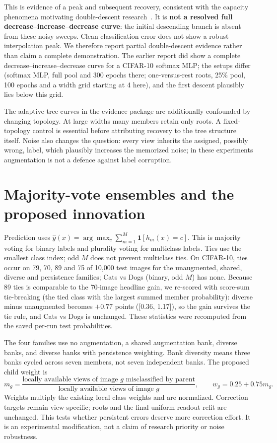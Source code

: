 \documentclass[11pt,a4paper]{article}
\begin{document}
This is evidence of a peak and subsequent recovery, consistent with the capacity phenomena motivating double-descent research~\cite{nakkiran}. It is \textbf{not a resolved full decrease--increase--decrease curve}: the initial descending branch is absent from these noisy sweeps. Clean classification error does not show a robust interpolation peak. We therefore report partial double-descent evidence rather than claim a complete demonstration. The earlier report did show a complete decrease--increase--decrease curve for a CIFAR-10 softmax MLP; the setups differ (softmax MLP, full pool and 300 epochs there; one-versus-rest roots, 25\% pool, 100 epochs and a width grid starting at 4 here), and the first descent plausibly lies below this grid.

The adaptive-tree curves in the evidence package are additionally confounded by changing topology. At large widths many members retain only roots. A fixed-topology control is essential before attributing recovery to the tree structure itself. Noise also changes the question: every view inherits the assigned, possibly wrong, label, which plausibly increases the memorized noise; in these experiments augmentation is not a defence against label corruption.

\section{Majority-vote ensembles and the proposed innovation}
Prediction uses $\hat y(x)=\arg\max_c\sum_{m=1}^{M}\mathbf1[h_m(x)=c]$. This is majority voting for binary labels and plurality voting for multiclass labels. Ties use the smallest class index; odd $M$ does not prevent multiclass ties. On CIFAR-10, ties occur on 79, 70, 89 and 75 of 10,000 test images for the unaugmented, shared, diverse and persistence families; Cats vs Dogs (binary, odd $M$) has none. Because 89 ties is comparable to the 70-image headline gain, we re-scored with score-sum tie-breaking (the tied class with the largest summed member probability): diverse minus unaugmented becomes $+0.77$ points ([0.36, 1.17]), so the gain survives the tie rule, and Cats vs Dogs is unchanged. These statistics were recomputed from the saved per-run test probabilities.

The four families use no augmentation, a shared augmentation bank, diverse banks, and diverse banks with persistence weighting. Bank diversity means three banks cycled across seven members, not seven independent banks. The proposed child weight is
\[
 m_g=\frac{\text{locally available views of image }g\text{ misclassified by parent}}
 {\text{locally available views of image }g},\qquad w_g=0.25+0.75m_g.
\]
Weights multiply the existing local class weights and are normalized. Correction targets remain view-specific; roots and the final uniform readout refit are unchanged. This tests whether persistent errors deserve more correction effort. It is an experimental modification, not a claim of research priority or noise robustness.
\end{document}
